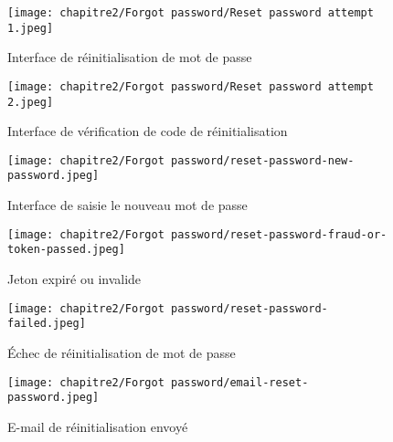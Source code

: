 \begin{figure}[H]
  \centering

  \begin{minipage}[t]{0.45\textwidth}
    \centering
    \texttt{[image: chapitre2/Forgot password/Reset password attempt 1.jpeg]}
    \caption{Interface de réinitialisation de mot de passe}
  \end{minipage}
  \hspace{1cm}
  \begin{minipage}[t]{0.45\textwidth}
    \centering
    \texttt{[image: chapitre2/Forgot password/Reset password attempt 2.jpeg]}
    \caption{Interface de vérification de code de réinitialisation}
  \end{minipage}

  \vspace{0.5cm}
  \begin{minipage}[t]{0.45\textwidth}
    \centering
    \texttt{[image: chapitre2/Forgot password/reset-password-new-password.jpeg]}
    \caption{Interface de saisie le nouveau mot de passe}
  \end{minipage}
  \hspace{1cm}
  \begin{minipage}[t]{0.45\textwidth}
    \centering
    \texttt{[image: chapitre2/Forgot password/reset-password-fraud-or-token-passed.jpeg]}
    \caption{Jeton expiré ou invalide}
  \end{minipage}


\end{figure}
\begin{figure}[H]
  \centering

  \begin{minipage}[t]{0.45\textwidth}
    \vspace*{0pt} %
    \centering
    \texttt{[image: chapitre2/Forgot password/reset-password-failed.jpeg]}
    \caption{Échec de réinitialisation de mot de passe}
  \end{minipage}
  \hspace{1cm}
  \begin{minipage}[t]{0.45\textwidth}
    \vspace*{0pt} %
    \centering
    \texttt{[image: chapitre2/Forgot password/email-reset-password.jpeg]}
    \caption{E-mail de réinitialisation envoyé}
  \end{minipage}

\end{figure}


